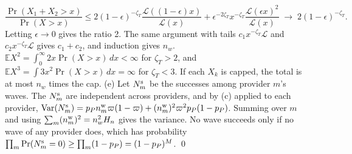 \[
\frac{\Pr(X_1+X_2>x)}{\Pr(X>x)}\le2(1-\epsilon)^{-\zeta_T}\frac{\mathcal L((1-\epsilon)x)}{\mathcal L(x)}+\epsilon^{-2\zeta_T}x^{-\zeta_T}\frac{\mathcal L(\epsilon x)^2}{\mathcal L(x)}\;\to\;2(1-\epsilon)^{-\zeta_T}.
\]
Letting $\epsilon\to0$ gives the ratio 2. The same argument with tails $c_1x^{-\zeta_T}\mathcal L$ and $c_2x^{-\zeta_T}\mathcal L$ gives $c_1+c_2$, and induction gives $n_w$. $\mathbb EX^2=\int_0^\infty2x\Pr(X>x)\,dx<\infty$ for $\zeta_T>2$, and $\mathbb EX^3=\int3x^2\Pr(X>x)\,dx=\infty$ for $\zeta_T<3$. If each $X_k$ is capped, the total is at most $n_w$ times the cap.
(e) Let $N^{\rm s}_m$ be the successes among provider $m$'s waves. The $N^{\rm s}_m$ are independent across providers, and by (c) applied to each provider, $\mathrm{Var}(N^{\rm s}_m)=p_Pn^{\rm w}_m\varpi(1-\varpi)+(n^{\rm w}_m)^2\varpi^2p_P(1-p_P)$. Summing over $m$ and using $\sum_m(n^{\rm w}_m)^2=n_w^2H_n$ gives the variance. No wave succeeds only if no wave of any provider does, which has probability $\prod_m\Pr(N^{\rm s}_m=0)\ge\prod_m(1-p_P)=(1-p_P)^M$. \qed


